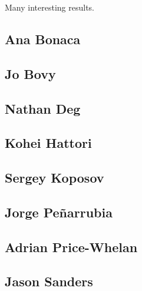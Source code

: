 Many interesting results.

\subsection{Ana Bonaca}\label{ssec:ana_results}


\subsection{Jo Bovy}\label{ssec:jo_results}


\subsection{Nathan Deg}\label{ssec:nathan_results}


\subsection{Kohei Hattori}\label{ssec:kohei_results}


\subsection{Sergey Koposov}\label{ssec:sergey_results}


\subsection{Jorge Pe\~narrubia}\label{ssec:jorge_results}


\subsection{Adrian Price-Whelan}\label{ssec:adrian_results}


\subsection{Jason Sanders}\label{ssec:jason_results}

